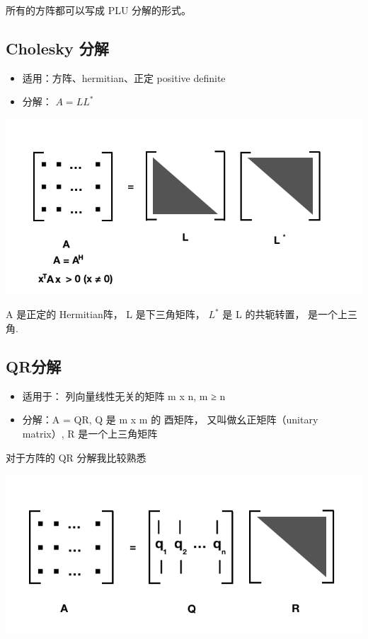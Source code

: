 \documentclass[
]{book}
\providecommand{\tightlist}{%
  \setlength{\itemsep}{0pt}\setlength{\parskip}{0pt}}
\begin{document}
所有的方阵都可以写成 PLU 分解的形式。

\hypertarget{cholesky-ux5206ux89e3}{%
\subsection{Cholesky 分解}\label{cholesky-ux5206ux89e3}}

\begin{itemize}
\tightlist
\item
  适用：方阵、hermitian、正定 positive definite
\item
  分解： \(A = LL^*\)
\end{itemize}

\includegraphics{images/Cholesky.png}

A 是正定的 Hermitian阵， L 是下三角矩阵， \(L^*\) 是 L 的共轭转置， 是一个上三角.

\hypertarget{qrux5206ux89e3}{%
\subsection{QR分解}\label{qrux5206ux89e3}}

\begin{itemize}
\tightlist
\item
  适用于： 列向量线性无关的矩阵 m x n, m ≥ n
\item
  分解：A = QR, Q 是 m x m 的 酉矩阵， 又叫做幺正矩阵（unitary matrix）, R 是一个上三角矩阵
\end{itemize}

对于方阵的 QR 分解我比较熟悉

\includegraphics{images/AQR.png}
\end{document}
